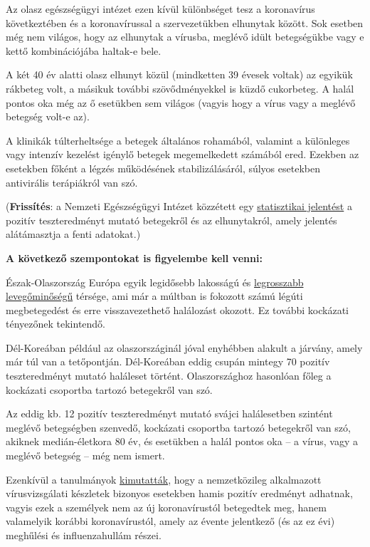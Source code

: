 Az olasz egészségügyi intézet ezen kívül különbséget tesz a koronavírus
következtében és a koronavírussal a szervezetükben elhunytak között. Sok
esetben még nem világos, hogy az elhunytak a vírusba, meglévő idült
betegségükbe vagy e kettő kombinációjába haltak-e bele.

A két 40 év alatti olasz elhunyt közül (mindketten 39 évesek voltak) az
egyikük rákbeteg volt, a másikuk további szövődményekkel is küzdő
cukorbeteg. A halál pontos oka még az ő esetükben sem világos (vagyis
hogy a vírus vagy a meglévő betegség volt-e az).

A klinikák túlterheltsége a betegek általános rohamából, valamint a
különleges vagy intenzív kezelést igénylő betegek megemelkedett számából
ered. Ezekben az esetekben főként a légzés működésének stabilizálásáról,
súlyos esetekben antivirális terápiákról van szó.

(\textbf{Frissítés}: a Nemzeti Egészségügyi Intézet közzétett egy
\href{https://www.epicentro.iss.it/coronavirus/bollettino/Report-COVID-2019_17_marzo-v2.pdf}{statisztikai
jelentést} a pozitív teszteredményt mutató betegekről és az
elhunytakról, amely jelentés alátámasztja a fenti adatokat.)

\textbf{A következő szempontokat is figyelembe kell venni:}

Észak-Olaszország Európa egyik legidősebb lakosságú és
\href{https://twitter.com/esa/status/1238480433047916545}{legrosszabb
levegőminőségű} térsége, ami már a múltban is fokozott számú légúti
megbetegedést és erre visszavezethető halálozást okozott. Ez további
kockázati tényezőnek tekintendő.

Dél-Koreában például az olaszországinál jóval enyhébben alakult a
járvány, amely már túl van a tetőpontján. Dél-Koreában eddig csupán
mintegy 70 pozitív teszteredményt mutató haláleset történt.
Olaszországhoz hasonlóan főleg a kockázati csoportba tartozó betegekről
van szó.

Az eddig kb. 12 pozitív teszteredményt mutató svájci halálesetben
szintént meglévő betegségben szenvedő, kockázati csoportba tartozó
betegekről van szó, akiknek medián-életkora 80 év, és esetükben a halál
pontos oka -- a vírus, vagy a meglévő betegség -- még nem ismert.

Ezenkívül a tanulmányok
\href{https://www.ncbi.nlm.nih.gov/pmc/articles/PMC2095096/}{kimutatták},
hogy a nemzetközileg alkalmazott vírusvizsgálati készletek bizonyos
esetekben hamis pozitív eredményt adhatnak, vagyis ezek a személyek nem
az új koronavírustól betegedtek meg, hanem valamelyik korábbi
koronavírustól, amely az évente jelentkező (és az ez évi) meghűlési és
influenzahullám részei.

